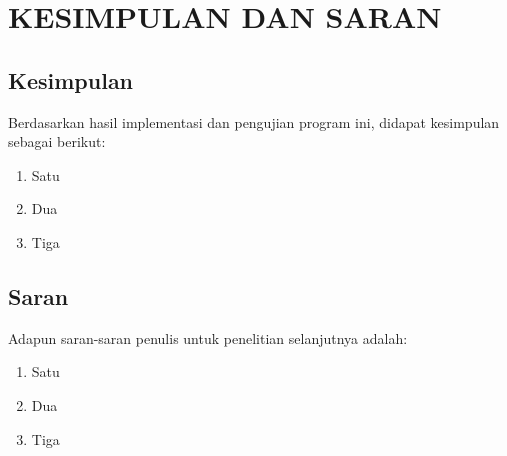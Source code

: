 
\chapter{KESIMPULAN DAN SARAN}

\section{Kesimpulan}
Berdasarkan hasil implementasi dan pengujian program ini, didapat kesimpulan sebagai berikut:

\begin{enumerate}
	\item Satu
	
	\item Dua
	
	\item Tiga

\end{enumerate}


\section{Saran}
Adapun saran-saran penulis untuk penelitian selanjutnya adalah:
\begin{enumerate}
	\item Satu
	
	\item Dua
	
	\item Tiga 
	
\end{enumerate}


\begin{comment}

\end{comment}